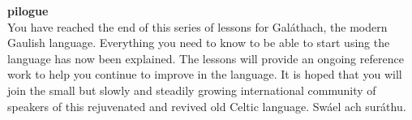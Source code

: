 \begin{center}
\textbf{pilogue}\\
\bigskip
You have reached the end of this series of lessons for Gal\'{a}thach, the modern Gaulish language. Everything you need to know to be able to start using the language has now been explained. The lessons will provide an ongoing reference work to help you continue to improve in the language. It is hoped that you will join the small but slowly and steadily growing international community of speakers of this rejuvenated and revived old Celtic language.
\bigskip
Sw\'{a}el ach sur\'{a}thu.
\end{center}
